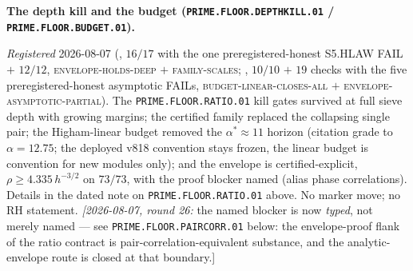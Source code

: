 \par\smallskip\noindent\textbf{The depth kill and the budget
(\texttt{PRIME.FLOOR.DEPTHKILL.01} /
\texttt{PRIME.FLOOR.BUDGET.01}).}
{\sloppy
\emph{Registered} 2026-08-07
(, $16/17$ with the one
preregistered-honest S5.HLAW FAIL $+$ $12/12$,
\textsc{envelope-holds-deep} $+$ \textsc{family-scales};
, $10/10$ $+$ $19$ checks
with the five preregistered-honest asymptotic FAILs,
\textsc{budget-linear-closes-all} $+$
\textsc{envelope-asymptotic-partial}).  The
\texttt{PRIME.FLOOR.RATIO.01} kill gates survived at full sieve
depth with growing margins; the certified family replaced the
collapsing single pair; the Higham-linear budget removed the
$\alpha^* \approx 11$ horizon (citation grade to $\alpha =
12.75$; the deployed v818 convention stays frozen, the linear
budget is convention for new modules only); and the envelope is
certified-explicit, $\rho \ge 4.335\,h^{-3/2}$ on $73/73$, with
the proof blocker named (alias phase correlations).  Details in
the dated note on \texttt{PRIME.FLOOR.RATIO.01} above.  No
marker move; no RH statement.  \emph{[2026-08-07, round 26:} the
named blocker is now \emph{typed}, not merely named --- see
\texttt{PRIME.FLOOR.PAIRCORR.01} below: the envelope-proof flank
of the ratio contract is pair-correlation-equivalent substance,
and the analytic-envelope route is closed at that boundary.]\par}


